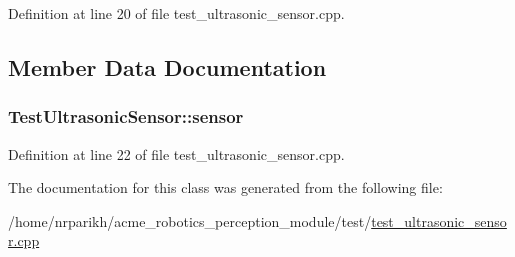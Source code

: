 Definition at line 20 of file test\+\_\+ultrasonic\+\_\+sensor.\+cpp.



\subsection{Member Data Documentation}
\subsubsection[{\texorpdfstring{sensor}{sensor}}]{ Test\+Ultrasonic\+Sensor\+::sensor\hspace{0.3cm}{\ttfamily [protected]}}\hypertarget{class_test_ultrasonic_sensor_abaaead54c0ad8a32f353b38b2f84127a}{}\label{class_test_ultrasonic_sensor_abaaead54c0ad8a32f353b38b2f84127a}


Definition at line 22 of file test\+\_\+ultrasonic\+\_\+sensor.\+cpp.



The documentation for this class was generated from the following file\+:\begin{DoxyCompactItemize}
\item 
/home/nrparikh/acme\+\_\+robotics\+\_\+perception\+\_\+module/test/\hyperlink{test__ultrasonic__sensor_8cpp}{test\+\_\+ultrasonic\+\_\+sensor.\+cpp}\end{DoxyCompactItemize}
